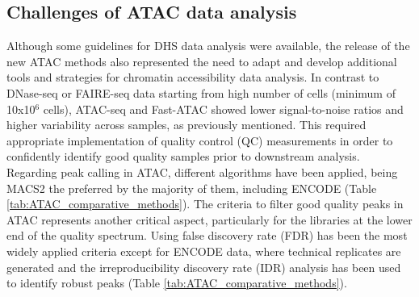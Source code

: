 \subsection{Challenges of ATAC data analysis}  
Although some guidelines for DHS data analysis were available, the release of the new ATAC methods also represented the need to adapt and develop additional tools and strategies for chromatin accessibility data analysis. In contrast to DNase-seq or FAIRE-seq data starting from high number of cells (minimum of 10x10$^6$ cells), ATAC-seq and Fast-ATAC showed lower signal-to-noise ratios and higher variability across samples, as previously mentioned. This required appropriate implementation of quality control (QC) measurements in order to confidently identify good quality samples prior to downstream analysis. Regarding peak calling in ATAC, different algorithms have been applied, being MACS2 the preferred by the majority of them, including ENCODE (Table \ref{tab:ATAC_comparative_methods}). The criteria to filter good quality peaks in ATAC represents another critical aspect, particularly for the libraries at the lower end of the quality spectrum. Using false discovery rate (FDR) has been the most widely applied criteria except for ENCODE data, where technical replicates are generated and the irreproducibility discovery rate (IDR) analysis has been used to identify robust peaks (Table \ref{tab:ATAC_comparative_methods}). 



